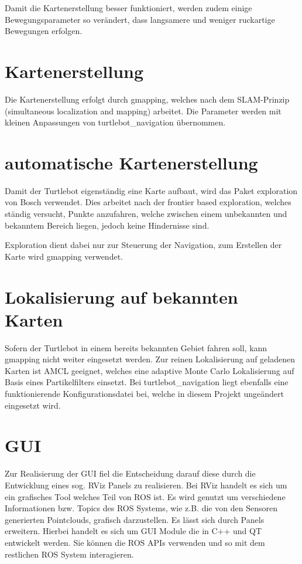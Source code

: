 Damit die Kartenerstellung besser funktioniert, werden zudem einige Bewegungsparameter so verändert, dass langsamere und weniger ruckartige Bewegungen erfolgen.

\section{Kartenerstellung}
Die Kartenerstellung erfolgt durch gmapping, welches nach dem SLAM-Prinzip (simultaneous localization and mapping) arbeitet. Die Parameter werden mit kleinen Anpassungen von turtlebot\_navigation übernommen.

\section{automatische Kartenerstellung}
Damit der Turtlebot eigenständig eine Karte aufbaut, wird das Paket exploration von Bosch verwendet. Dies arbeitet nach der frontier based exploration, welches ständig versucht, Punkte anzufahren, welche zwischen einem unbekannten und bekanntem Bereich liegen, jedoch keine Hindernisse sind.

Exploration dient dabei nur zur Steuerung der Navigation, zum Erstellen der Karte wird gmapping verwendet.

\section{Lokalisierung auf bekannten Karten}
Sofern der Turtlebot in einem bereits bekannten Gebiet fahren soll, kann gmapping nicht weiter eingesetzt werden. Zur reinen Lokalisierung auf geladenen Karten ist AMCL geeignet, welches eine adaptive Monte Carlo Lokalisierung auf Basis eines Partikelfilters einsetzt. Bei turtlebot\_navigation liegt ebenfalls eine funktionierende Konfigurationsdatei bei, welche in diesem Projekt ungeändert eingesetzt wird.

\section{GUI}
Zur Realisierung der GUI fiel die Entscheidung darauf diese durch die Entwicklung eines sog. RViz Panels zu realisieren. Bei RViz handelt es sich um ein grafisches Tool welches Teil von ROS ist. Es wird genutzt um verschiedene Informationen bzw. Topics des ROS Systems, wie z.B. die von den Sensoren generierten Pointclouds, grafisch darzustellen. Es lässt sich durch Panels erweitern. Hierbei handelt es sich um GUI Module die in C++ und QT entwickelt werden. Sie können die ROS APIs verwenden und so mit dem restlichen ROS System interagieren.
